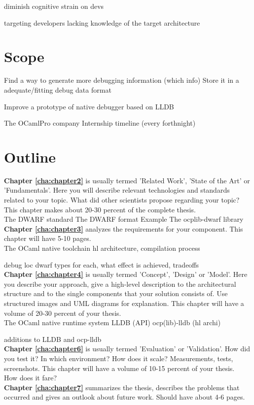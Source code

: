 diminish cognitive strain on devs

targeting developers lacking knowledge of the target architecture

\section{Scope\label{sec:scope}}

Find a way to generate more debugging information (which info)
Store it in a adequate/fitting debug data format

Improve a prototype of native debugger based on LLDB

The OCamlPro company
Internship timeline (every forthnight)

\section{Outline\label{sec:outline}}

\textbf{Chapter \ref{cha:chapter2}} is usually termed 'Related Work', 'State of the Art' or 'Fundamentals'. Here you will describe relevant technologies and standards related to your topic. What did other scientists propose regarding your topic? This chapter makes about 20-30 percent of the complete thesis.
\\
The DWARF standard
The DWARF format
Example
The ocplib-dwarf library
\\
\textbf{Chapter \ref{cha:chapter3}} analyzes the requirements for your component. This chapter will have 5-10 pages.
\\
The OCaml native toolchain
hl architecture, compilation process

debug loc
dwarf
types
for each, what effect is achieved, tradeoffs
\\
\textbf{Chapter \ref{cha:chapter4}} is usually termed 'Concept', 'Design' or 'Model'. Here you describe your approach, give a high-level description to the architectural structure and to the single components that your solution consists of. Use structured images and UML diagrams for explanation. This chapter will have a volume of 20-30 percent of your thesis.
\\
The OCaml native runtime system
LLDB (API)
ocp(lib)-lldb (hl archi)

additions to LLDB and ocp-lldb
\\
\textbf{Chapter \ref{cha:chapter6}} is usually termed 'Evaluation' or 'Validation'. How did you test it? In which environment? How does it scale? Measurements, tests, screenshots. This chapter will have a volume of 10-15 percent of your thesis.
\\
How does it fare?
\\
\textbf{Chapter \ref{cha:chapter7}} summarizes the thesis, describes the problems that occurred and gives an outlook about future work. Should have about 4-6 pages.


